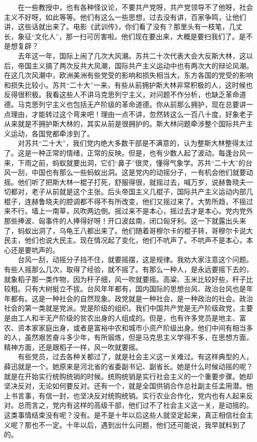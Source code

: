 \documentclass[cn,11pt,chinese]{elegantbook}
\begin{document}
　　在一些教授中，也有各种怪议论，不要共产党呀，共产党领导不了他呀，社会主义不好呀，如此等等。他们有这么一些思想，过去没有讲，百家争鸣，让他们讲，这些话就出来了。电影《武训传》，你们看了没有？那里头有一枝笔，几丈长，象征“文化人”，那一扫可厉害啦。他们现在要出来，大概是要扫我们了。是不是想复辟？\\
　　去年这一年，国际上闹了几次大风潮。苏共二十次代表大会大反斯大林，这以后，帝国主义搞了两次反共大风潮，国际共产主义运动中也有两次大的辩论风潮。在这几次风潮中，欧洲美洲有些党受的影响和损失相当大，东方各国的党受的影响和损失比较小。苏共“二十大”一来，有些从前拥护斯大林非常积极的人，这时候也反得很积极。我看这些人不讲马克思列宁主义，对问题不作分析，也缺乏革命道德。马克思列宁主义也包括无产阶级的革命道德。你从前那么拥护，现在总要讲一点理由，才能转过这个弯来吧！理由一点不讲，忽然转这么一百八十度，好象老子从来就是不拥护斯大林的，其实从前是很拥护的。斯大林问题牵涉整个国际共产主义运动，各国党都牵涉到了。\\
　　对苏共“二十大”，我们党内绝大多数干部是不满意的，认为整斯大林整得太过了。这是一种正常的情绪，正常的反映。但是，也有少数人起了波动。每逢台风一来，下雨之前，蚂蚁就要出洞，它们“鼻子”很灵，懂得气象学。苏共“二十大”的台风一刮，中国也有那么一些蚂蚁出洞。这是党内的动摇分子，一有机会他们就要动摇。他们听了把斯大林一棍子打死，舒服得很，就摇过去，喊万岁，说赫鲁晓夫一切都对，老子从前就是这个主张。后头帝国主义几棍子，国际共产主义运动内部几棍子，连赫鲁晓夫的腔调都不得不有所改变，他们又摇过来了。大势所趋，不摇过来不行。墙上一南草，风吹两边倒。摇过来不是本心，摇过去才是本心。党内党外那些捧波、匈事件的人捧得好呀！开口波兹南，闭口匈牙利。这一下就露出头来了，蚂蚁出洞了，乌龟王八都出来了。他们随着哥穆尔卡的棍子转，哥穆尔卡说大民主，他们也说大民主。现在情况起了变化，他们不吭声了。不吭声不是本心，本心还是要吭声的。\\
　　台风一刮，动摇分子挡不住，就要摇摆，这是规律。我劝大家注意这个问题。有些人摇那么几次，取得了经验，就不摇了。有那么一种人，是永远要摇下去的，就象稻子那一类作物，因为秆子细，风一吹就要摇。高粱、玉米比较好些，秆子比较粗。只有大树挺立不拔。台风年年都有，国内国际的思想台风、政治台风也是年年都有。这是一种社会的自然现象。政党就是一种社会，是一种政治的社会。政治社会的第一类就是党派。党是阶级的组织。我们中国共产党是无产阶级政党，主要是由工人和半无产阶级的贫农出身的人组成的。但是，也有许多党员是地主、富农、资本家家庭出身，或者是富裕中农和城市小资产阶级出身。他们中间有相当多的人，虽然艰苦奋斗多少年，有所锻炼，但是马克思主义学得不多，在思想方面，精神方面，还是跟稻子一样，风一吹就要摇。\\
　　有些党员，过去各种关都过了，就是社会主义这一关难过。有这样典型的人，薛迅就是一个。她原来是河北省的省委副书记、副省长。她是什么时候动摇的呢？就是在开始实行统购统销的时候。统购统销是实行社会主义的一个重要步骤。她却坚决反对，无论如何要反对。还有一个，就是全国供销合作总社副主任孟用潜。他上书言事，有信一封，也坚决反对统购统销。实行农业合作化，党内也有人起来反对。总而言之，党内有这样的高级干部，他们过不了社会主义这一关，是动摇的。这类事情结束没有呢？没有。是不是十年以后这些人就坚定起来，真正相信社会主义呢？那也不一定。十年以后，遇到出什么问题，他们还可能说，我早就料到了的。\\
\end{document}
